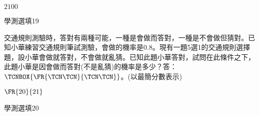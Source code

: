 \begin{QUESTIONS}
\begin{QUESTION}
\begin{QBODY}
        \end{QBODY}
        \begin{QFROMS}
        \end{QFROMS}
        \begin{QTAGS}\end{QTAGS}
        \begin{QANS}
		$2100$
        \end{QANS}
        \begin{QSOLLIST}
        \end{QSOLLIST}
        \begin{QEMPTYSPACE}
        \end{QEMPTYSPACE}
    \end{QUESTION}
    \begin{QUESTION}
        \begin{ExamInfo}{89}{學測}{選填}{19}
        \end{ExamInfo}
        \begin{ExamAnsRateInfo}{}{}{}{}
        \end{ExamAnsRateInfo}
        \begin{QBODY}
		交通規則測驗時，答對有兩種可能，一種是會做而答對，一種是不會做但猜對。已知小華練習交通規則筆試測驗，會做的機率是0.8。現有一題5選1的交通規則選擇題，設小華會做就答對，不會做就亂猜。已知此題小華答對，試問在此條件之下，此題小華是因會做而答對(不是亂猜)的機率是多少？答：$\TCNBOX{\FR{\TCN\TCN}{\TCN\TCN}}$。(以最簡分數表示)
        \end{QBODY}
        \begin{QFROMS}
        \end{QFROMS}
        \begin{QTAGS}\end{QTAGS}
        \begin{QANS}
		$\FR{20}{21}$
        \end{QANS}
        \begin{QSOLLIST}
        \end{QSOLLIST}
        \begin{QEMPTYSPACE}
        \end{QEMPTYSPACE}
    \end{QUESTION}
    \begin{QUESTION}
        \begin{ExamInfo}{89}{學測}{選填}{20}
        \end{ExamInfo}
        \begin{ExamAnsRateInfo}{}{}{}{}
        \end{ExamAnsRateInfo}

\end{QUESTION}
\end{QUESTIONS}
